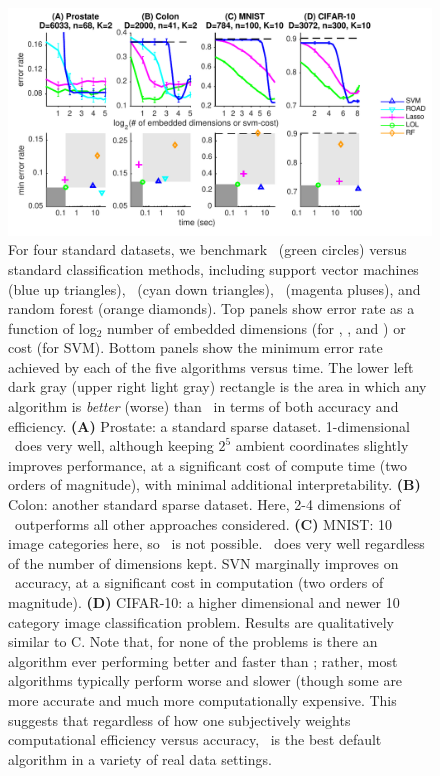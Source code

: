 \documentclass[10pt]{article}
\begin{document}
\begin{figure}
\centering
\includegraphics[width=1\linewidth]{../Figs/realdata}
\caption{
For four standard datasets, we benchmark \Lol~(green circles) versus standard classification methods, including support vector machines (blue up triangles), \Road~(cyan down triangles), ~(magenta pluses), and random forest (orange diamonds).
Top panels show error rate as a function of log$_2$ number of embedded dimensions (for \Lol, \Road, and ) or cost (for SVM).
Bottom panels show the minimum error rate achieved by each of the five algorithms versus time.
The lower left dark gray (upper right light gray) rectangle is the area in which any algorithm is \emph{better}  (worse) than \Lol~in terms of both accuracy and efficiency.
\textbf{(A)} Prostate: a standard sparse dataset.  1-dimensional \Lol~does very well, although keeping $2^5$ ambient coordinates slightly improves performance, at a significant cost of compute time (two orders of magnitude), with minimal additional interpretability.
\textbf{(B)} Colon: another standard sparse dataset.  Here, 2-4 dimensions of \Lol~outperforms all other approaches considered.
\textbf{(C)} MNIST: 10 image categories here, so \Road~is not possible.  \Lol~does very well regardless of the number of dimensions kept.  SVN marginally improves on \Lol~accuracy, at a significant cost in computation (two orders of magnitude).
\textbf{(D)} CIFAR-10: a higher dimensional and newer 10 category image classification problem.  Results are qualitatively similar to C.
%
Note that, for none of the problems is there an algorithm ever performing better and faster than \Lol; rather, most algorithms typically perform worse and slower (though some are more accurate and much more computationally expensive.
This suggests that regardless of how one subjectively weights computational efficiency versus accuracy, \Lol~is the best default algorithm in a variety of real data settings.
}
\label{f:realdata}
\end{figure}
\end{document}
